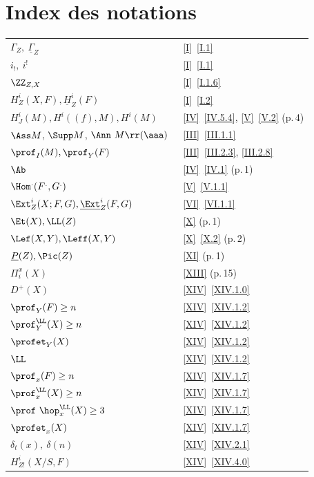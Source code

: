 \chapter*{Index des notations}

\begin{tabular}{p{9cm}p{3cm}}
$\Gamma_{Z}, \ \underline{\Gamma}_{Z}$\ \dotfill & \ref{I}~\ref{I.1}\\
$i_{!}, \ i^{!}$\ \dotfill & \ref{I}~\ref{I.1}\\
$\ZZ_{Z, X}$\ \dotfill & \ref{I}~\ref{I.1.6}\\
$H^{i}_{Z}(X, F), \underline{H}^{i}_{Z}(F)$\ \dotfill & \ref{I}~\ref{I.2}\\
$H^{i}_{J}(M), H^{i}((f), M), H^{i}(M)$\ \dotfill & \ref{IV}~\ref{IV.5.4}, \ref{V}~\ref{V.2} (p.\,4)\\
$\Ass M$, $\Supp M$, $\Ann \ M \rr(\aaa)$\ \dotfill & \ref{III}~\ref{III.1.1}\\
$\prof_{I}(M), \prof_{Y}(F)$\ \dotfill & \ref{III}~\ref{III.2.3}, \ref{III.2.8}\\
$\Ab$\ \dotfill & \ref{IV}~\ref{IV.1} (p.\,1)\\
$\Hom^{.}(F^{.}, G^{.})$\ \dotfill & \ref{V}~\ref{V.1.1}\\
$\Ext^{i}_{Z}(X;F, G), \underline{\Ext}^{i}_{Z}(F, G)$\ \dotfill & \ref{VI}~\ref{VI.1.1}\\
${\Et}(X), \LL(Z)$\ \dotfill & \ref{X} (p.\,1)\\
$\Lef(X, Y), \Leff(X, Y)$\ \dotfill & \ref{X}~\ref{X.2} (p.\,2)\\
$\underline{P}(Z), \Pic(Z)$\ \dotfill & \ref{XI} (p.\,1)\\
$\Pi_{i}^{x}(X)$\ \dotfill & \ref{XIII} (p.\,15)\\
$D^{+}(X)$\ \dotfill & \ref{XIV}~\ref{XIV.1.0}\\
$\prof_{Y}(F) \geq n$\ \dotfill & \ref{XIV}~\ref{XIV.1.2}\\
$\prof_{Y}^{\LL}(X) \geq n$\ \dotfill & \ref{XIV}~\ref{XIV.1.2}\\
$\profet_{Y}(X)$\ \dotfill & \ref{XIV}~\ref{XIV.1.2}\\
$\LL$\ \dotfill & \ref{XIV}~\ref{XIV.1.2}\\
$\prof_{x}(F) \geq n$\ \dotfill & \ref{XIV}~\ref{XIV.1.7}\\
$\prof_{x}^{\LL}(X)\geq n$\ \dotfill & \ref{XIV}~\ref{XIV.1.7}\\
$\prof\ \hop^{\LL}_{x}(X) \geq 3$\ \dotfill & \ref{XIV}~\ref{XIV.1.7}\\
$\profet_{x}(X)$\ \dotfill& \ref{XIV}~\ref{XIV.1.7}\\
$\delta_{t}(x), \ \delta (n)$\ \dotfill & \ref{XIV}~\ref{XIV.2.1}\\
$H^{i}_{Z!}(X/S, F)$\ \dotfill & \ref{XIV}~\ref{XIV.4.0}
\end{tabular}

